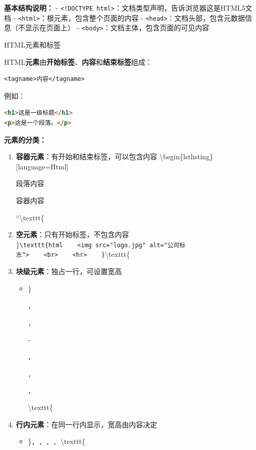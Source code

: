 \textbf{基本结构说明：} - \texttt{<!DOCTYPE html>}：文档类型声明，告诉浏览器这是HTML5文档 - \texttt{<html>}：根元素，包含整个页面的内容 - \texttt{<head>}：文档头部，包含元数据信息（不显示在页面上） - \texttt{<body>}：文档主体，包含页面的可见内容

 HTML元素和标签

HTML\textbf{元素}由\textbf{开始标签}、\textbf{内容}和\textbf{结束标签}组成：

\begin{lstlisting}
<tagname>内容</tagname>
\end{lstlisting}

例如：

\begin{lstlisting}[language=Html]
<h1>这是一级标题</h1>
<p>这是一个段落。</p>
\end{lstlisting}

\textbf{元素的分类：}

\begin{enumerate}
\def\labelenumi{\arabic{enumi}.}
\item
  \textbf{容器元素}：有开始和结束标签，可以包含内容 \textbackslash begin\{lstlisting\}{[}language=Html{]}

  段落内容

  容器内容

  ``\textbackslash texttt\{
\item
  \textbf{空元素}：只有开始标签，不包含内容 \}\texttt{\textbackslash{}texttt\{html\ \ \ \ \textless{}img\ src="logo.jpg"\ alt="公司标志"\textgreater{}\ \ \ \ \textless{}br\textgreater{}\ \ \ \ \textless{}hr\textgreater{}\ \ \ \ \}}\textbackslash texttt\{
\item
  \textbf{块级元素}：独占一行，可设置宽高

  \begin{itemize}
  \tightlist
  \item
    \}

    \texttt{, }

    \texttt{, }

    -

    \texttt{, }

    \texttt{, }

    \texttt{, }

    \textbackslash texttt\{
  \end{itemize}
\item
  \textbf{行内元素}：在同一行内显示，宽高由内容决定

  \begin{itemize}
  \tightlist
  \item
    \}\texttt{, }\texttt{, }\texttt{, }\texttt{, }\textbackslash texttt\{
  \end{itemize}
\end{enumerate}

